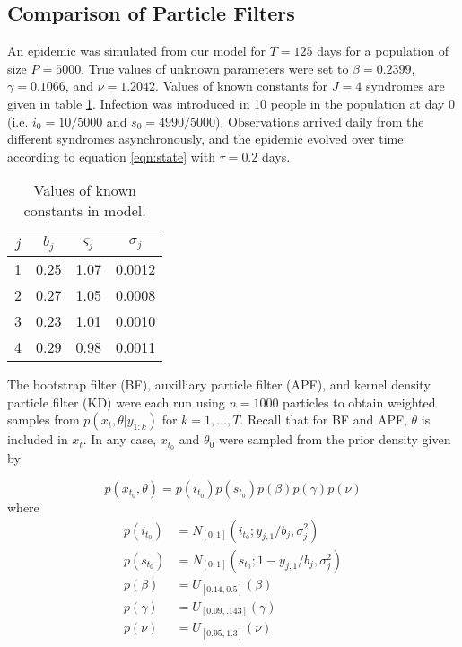 \documentclass{article}
\begin{document}
\subsection{Comparison of Particle Filters}

An epidemic was simulated from our model for $T = 125$ days for a population of size $P = 5000$.  True values of unknown parameters were set to $\beta = 0.2399$, $\gamma = 0.1066$, and $\nu = 1.2042$.  Values of known constants for $J = 4$ syndromes are given in table \ref{tab:true}.  Infection was introduced in 10 people in the population at day 0 (i.e. $i_0 = 10/5000$ and $s_0 = 4990/5000$).  Observations arrived daily from the different syndromes asynchronously, and the epidemic evolved over time according to equation \eqref{eqn:state} with $\tau = 0.2$ days.

\begin{table}[ht]
\begin{center}
\caption{Values of known constants in model.}
\label{tab:true}
\begin{tabular}{|cccc|}
\hline
$j$ & $b_j$ & $\varsigma_j$ & $\sigma_j$ \\
\hline
1 & 0.25 & 1.07 & 0.0012 \\
2 & 0.27 & 1.05 & 0.0008 \\
3 & 0.23 & 1.01 & 0.0010 \\
4 & 0.29 & 0.98 & 0.0011 \\
\hline
\end{tabular}
\end{center}
\end{table}

The bootstrap filter (BF), auxilliary particle filter (APF), and kernel density particle filter (KD) were each run using $n = 1000$ particles to obtain weighted samples from $p(x_t,\theta|y_{1:k})$ for $k = 1,\ldots,T$.  Recall that for BF and APF, $\theta$ is included in $x_t$.  In any case, $x_{t_0}$ and $\theta_{0}$ were sampled from the prior density given by

\[p(x_{t_0},\theta) = p(i_{t_0})p(s_{t_0})p(\beta)p(\gamma)p(\nu)\] where
\begin{align*}
p(i_{t_0}) &= N_{[0,1]}(i_{t_0};y_{j,1}/b_j,\sigma^2_j) \\
p(s_{t_0}) &= N_{[0,1]}(s_{t_0};1 - y_{j,1}/b_j,\sigma^2_j) \\
p(\beta) &= U_{[0.14,0.5]}(\beta) \\
p(\gamma) &= U_{[0.09,.143]}(\gamma) \\
p(\nu) &= U_{[0.95,1.3]}(\nu)
\end{align*}
\end{document}
